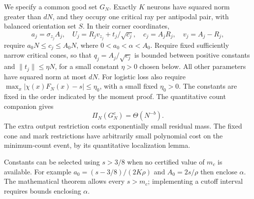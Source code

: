 \documentclass[11pt]{article}
\begin{document}
We specify a common good set $G_N$. Exactly $K$ neurons have squared
norm greater than $dN$, and they occupy one critical ray per antipodal
pair, with balanced orientation set $S$. In their corner coordinates,
\[
 a_j=\sigma_{z_j}A_j,\quad U_j=R_jv_{z_j}+t_j/\sqrt{c_j},\quad
 c_j=A_jR_j,\quad v_j=A_j-R_j,
\]
require $a_0N\le c_j\le A_0N$, where $0<a_0<\alpha<A_0$.
Require fixed sufficiently narrow critical cones, so that
$q_j=A_j/\sqrt{c_j}$ is bounded between positive constants and
$\|t_j\|\le\eta N$, for a small constant $\eta>0$ chosen below.
All other parameters have squared norm at most $dN$.
For logistic loss also require
$\max_x|\chi(x)F_N(x)-s|\le\eta_0$, with a small fixed $\eta_0>0$.
The constants are fixed in the order indicated by the moment proof.
The quantitative count companion gives
\[
                  \Pi_N(G_N^c)=\Theta(N^{-b}).           \tag{3}
\]
The extra output restriction costs exponentially small residual mass.
The fixed cone and mark restrictions have arbitrarily small polynomial
cost on the minimum-count event, by its quantitative localization lemma.

Constants can be selected using $s>3/8$ when no certified value of $m_c$
is available. For example $a_0=(s-3/8)/(2K\rho)$ and $A_0=2s/\rho$
then enclose $\alpha$. The mathematical theorem allows every $s>m_c$;
implementing a cutoff interval requires bounds enclosing $\alpha$.
\end{document}
